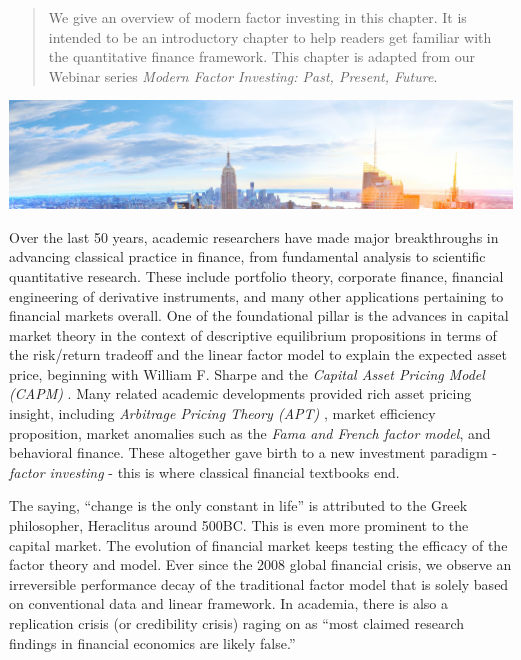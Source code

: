 \documentclass[
]{book}
\begin{document}
\begin{quote}
We give an overview of modern factor investing in this chapter. It is intended to be an introductory chapter to help readers get familiar with the quantitative finance framework. This chapter is adapted from our Webinar series {\emph{Modern Factor Investing: Past, Present, Future}}.
\end{quote}

\includegraphics[width=1\linewidth]{images/chapter3/nyc}

Over the last 50 years, academic researchers have made major breakthroughs in advancing classical practice in finance, from fundamental analysis to scientific quantitative research. These include portfolio theory, corporate finance, financial engineering of derivative instruments, and many other applications pertaining to financial markets overall. One of the foundational pillar is the advances in capital market theory in the context of descriptive equilibrium propositions in terms of the risk/return tradeoff and the linear factor model to explain the expected asset price, beginning with William F. Sharpe and the {\emph{Capital Asset Pricing Model (CAPM)}} \citep{sharpe1964capital}. Many related academic developments provided rich asset pricing insight, including {\emph{Arbitrage Pricing Theory (APT)}} \citep{ross1976arbitrage}, market efficiency proposition, market anomalies such as the {\emph{Fama and French factor model}}, and behavioral finance. These altogether gave birth to a new investment paradigm - {\emph{factor investing}} - this is where classical financial textbooks end.

The saying, ``change is the only constant in life'' is attributed to the Greek philosopher, Heraclitus around 500BC. This is even more prominent to the capital market. The evolution of financial market keeps testing the efficacy of the factor theory and model. Ever since the 2008 global financial crisis, we observe an irreversible performance decay of the traditional factor model that is solely based on conventional data and linear framework. In academia, there is also a replication crisis (or credibility crisis) raging on as ``most claimed research findings in financial economics are likely false.'' \citep{harvey2016and}
\end{document}

